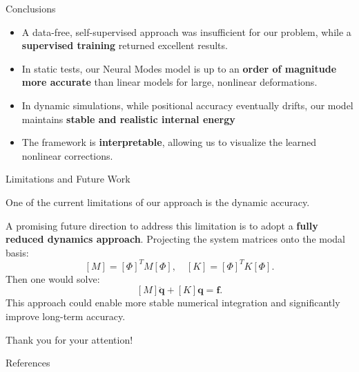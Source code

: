 \documentclass[9pt]{beamer}
\begin{document}
\begin{frame}{Conclusions}
    
    \begin{itemize}
        \item A data-free, self-supervised approach was insufficient for our problem, while a \textbf{supervised training} returned excellent results.
        
        \item  In static tests, our Neural Modes model is up to an \textbf{order of magnitude more accurate} than linear models for large, nonlinear deformations.
   
        
        \item In dynamic simulations, while positional accuracy eventually drifts, our model maintains \textbf{stable and realistic internal energy}
        \item The framework is \textbf{interpretable}, allowing us to visualize the learned nonlinear corrections.
    \end{itemize}
\end{frame}


\begin{frame}{Limitations and Future Work}
    
    One of the current limitations of our approach is the dynamic accuracy.

    A promising future direction to address this limitation is to adopt a \textbf{fully reduced dynamics approach}. Projecting the system matrices onto the modal basis:
    \[
        \left[M\right] = \left[\Phi\right]^T M \left[\Phi\right], \quad \left[K\right] = \left[\Phi\right]^T K \left[\Phi\right].
    \]
Then one would solve:
    \[
        \left[{M}\right] \ddot{\mathbf{q}} + \left[{K}\right] \mathbf{q} = \mathbf{f}.
    \]
    This approach could enable more stable numerical integration and significantly improve long-term accuracy.

\end{frame}

\begin{frame} %
    \centering
    \Huge Thank you for your attention! 
    \vspace{1em}
    
\end{frame}

\begin{frame}[allowframebreaks]{References}
    \printbibliography[heading=none]
\end{frame}
\end{document}
